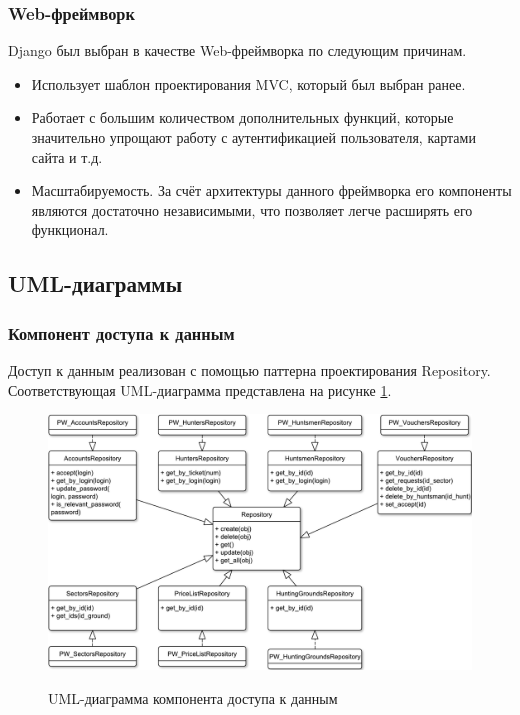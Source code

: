 	\subsubsection{Web-фреймворк}
	Django \cite{django} был выбран в качестве Web-фреймворка по следующим причинам.
	\begin{itemize}
		\item Использует шаблон проектирования MVC, который был выбран ранее.
		\item Работает с большим количеством дополнительных функций, которые значительно упрощают работу с аутентификацией пользователя, картами сайта и т.д.
		\item Масштабируемость. За счёт архитектуры данного фреймворка его компоненты являются достаточно независимыми, что позволяет легче расширять его функционал.
	\end{itemize}

	\subsection{UML-диаграммы}
		\subsubsection{Компонент доступа к данным}
		Доступ к данным реализован с помощью паттерна проектирования Repository. Соответствующая UML-диаграмма представлена на рисунке \ref{fig6:image}.
		
		\begin{figure}[ph!]
			\centering
			\begin{center}
				{\includegraphics[scale=0.6]{schemes/uml_access_rep.pdf}}
				\caption{UML-диаграмма компонента доступа к данным}
				\label{fig6:image}
			\end{center}
		\end{figure}
		\newpage
	
